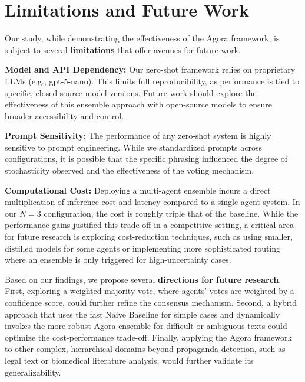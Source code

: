 \section{Limitations and Future Work}


Our study, while demonstrating the effectiveness of the Agora framework, is subject to several \textbf{limitations} that offer avenues for future work.

\textbf{Model and API Dependency:} Our zero-shot framework relies on proprietary LLMs (e.g., gpt-5-nano). This limits full reproducibility, as performance is tied to specific, closed-source model versions. Future work should explore the effectiveness of this ensemble approach with open-source models to ensure broader accessibility and control.

\textbf{Prompt Sensitivity:} The performance of any zero-shot system is highly sensitive to prompt engineering. While we standardized prompts across configurations, it is possible that the specific phrasing influenced the degree of stochasticity observed and the effectiveness of the voting mechanism.

\textbf{Computational Cost:} Deploying a multi-agent ensemble incurs a direct multiplication of inference cost and latency compared to a single-agent system. In our $N=3$ configuration, the cost is roughly triple that of the baseline. While the performance gains justified this trade-off in a competitive setting, a critical area for future research is exploring cost-reduction techniques, such as using smaller, distilled models for some agents or implementing more sophisticated routing where an ensemble is only triggered for high-uncertainty cases.


Based on our findings, we propose several \textbf{directions for future research}. First, exploring a weighted majority vote, where agents' votes are weighted by a confidence score, could further refine the consensus mechanism. Second, a hybrid approach that uses the fast Naive Baseline for simple cases and dynamically invokes the more robust Agora ensemble for difficult or ambiguous texts could optimize the cost-performance trade-off. Finally, applying the Agora framework to other complex, hierarchical domains beyond propaganda detection, such as legal text or biomedical literature analysis, would further validate its generalizability.

